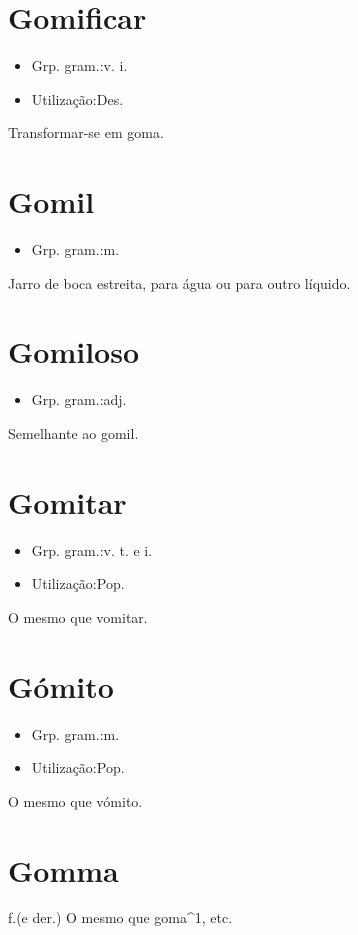 \section{Gomificar}
\begin{itemize}
\item {Grp. gram.:v. i.}
\end{itemize}
\begin{itemize}
\item {Utilização:Des.}
\end{itemize}
Transformar-se em goma.
\section{Gomil}
\begin{itemize}
\item {Grp. gram.:m.}
\end{itemize}
Jarro de boca estreita, para água ou para outro líquido.
\section{Gomiloso}
\begin{itemize}
\item {Grp. gram.:adj.}
\end{itemize}
Semelhante ao gomil.
\section{Gomitar}
\begin{itemize}
\item {Grp. gram.:v. t.  e  i.}
\end{itemize}
\begin{itemize}
\item {Utilização:Pop.}
\end{itemize}
O mesmo que \textunderscore vomitar\textunderscore .
\section{Gómito}
\begin{itemize}
\item {Grp. gram.:m.}
\end{itemize}
\begin{itemize}
\item {Utilização:Pop.}
\end{itemize}
O mesmo que \textunderscore vómito\textunderscore .
\section{Gomma}
\textunderscore f.\textunderscore  (e der.)
O mesmo que \textunderscore goma\textunderscore ^1, etc.
